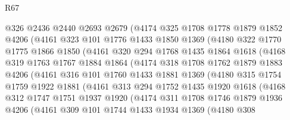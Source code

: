 \begin{lexlean}{R67}
\begin{coremodule}
            @326
            @2436
            @2440
            @2693
            @2679
            (@4174
              @325
              @1708
              @1778
              @1879
              @1852
              @4206
              (@4161
                @323
                @101
                @1776
                @1433
                @1850
                @1369
                (@4180
                  @322
                  @1770
                  @1775
                  @1866
                  @1850
                  (@4161
                    @320
                    @294
                    @1768
                    @1435
                    @1864
                    @1618
                    (@4168
                      @319
                      @1763
                      @1767
                      @1884
                      @1864
                      (@4174
                        @318
                        @1708
                        @1762
                        @1879
                        @1883
                        @4206
                        (@4161
                          @316
                          @101
                          @1760
                          @1433
                          @1881
                          @1369
                          (@4180
                            @315
                            @1754
                            @1759
                            @1922
                            @1881
                            (@4161
                              @313
                              @294
                              @1752
                              @1435
                              @1920
                              @1618
                              (@4168
                                @312
                                @1747
                                @1751
                                @1937
                                @1920
                                (@4174
                                  @311
                                  @1708
                                  @1746
                                  @1879
                                  @1936
                                  @4206
                                  (@4161
                                    @309
                                    @101
                                    @1744
                                    @1433
                                    @1934
                                    @1369
                                    (@4180
                                      @308

\end{coremodule}
\end{lexlean}
